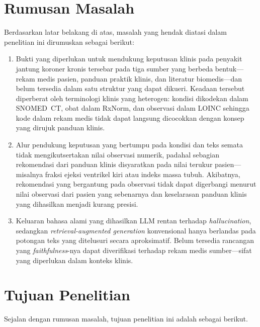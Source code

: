 \section{Rumusan Masalah}

Berdasarkan latar belakang di atas, masalah yang hendak diatasi dalam penelitian ini
dirumuskan sebagai berikut:

\begin{enumerate}
    \item Bukti yang diperlukan untuk mendukung keputusan klinis pada penyakit jantung
    koroner kronis tersebar pada tiga sumber yang berbeda bentuk---rekam medis pasien,
    panduan praktik klinis, dan literatur biomedis---dan belum tersedia dalam satu
    struktur yang dapat dikueri. Keadaan tersebut diperberat oleh terminologi klinis yang
    heterogen: kondisi dikodekan dalam SNOMED~CT, obat dalam RxNorm, dan observasi dalam
    LOINC sehingga kode dalam rekam medis tidak dapat langsung dicocokkan dengan konsep
    yang dirujuk panduan klinis.

    \item Alur pendukung keputusan yang bertumpu pada kondisi dan teks semata tidak mengikutsertakan
    nilai observasi numerik, padahal sebagian rekomendasi dari panduan klinis disyaratkan pada nilai
    terukur pasien---misalnya fraksi ejeksi ventrikel kiri atau indeks massa tubuh.
    Akibatnya, rekomendasi yang bergantung pada observasi tidak dapat digerbangi menurut
    nilai observasi dari pasien yang sebenarnya dan keselarasan panduan klinis yang dihasilkan menjadi kurang
    presisi.

    \item Keluaran bahasa alami yang dihasilkan LLM rentan terhadap \emph{hallucination},
    sedangkan \emph{retrieval-augmented generation} konvensional hanya berlandas pada
    potongan teks yang ditelusuri secara aproksimatif. Belum tersedia rancangan yang
    \emph{faithfulness}-nya dapat diverifikasi terhadap rekam medis sumber---sifat yang
    diperlukan dalam konteks klinis.
\end{enumerate}

\section{Tujuan Penelitian}

Sejalan dengan rumusan masalah, tujuan penelitian ini adalah sebagai berikut.

